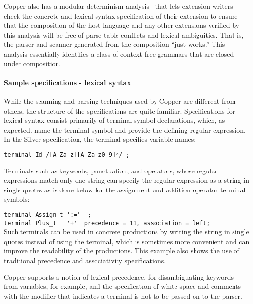 Copper also has a modular determinism
analysis~\cite{schwerdfeger09pldi} that lets extension writers check
the concrete and lexical syntax specification of their extension to
ensure that the composition of the host language and any other
extensions verified by this analysis will be free of parse table
conflicts and lexical ambiguities.  That is, the parser and scanner
generated from the composition ``just works.''  This analysis
essentially identifies a class of context free grammars that are
closed under composition.


\paragraph{Sample specifications - lexical syntax}
While the scanning and parsing techniques used by Copper are different
from others, the structure of the specifications are quite familiar.
%
Specifications for lexical syntax consist primarily of terminal symbol
declarations, which, as expected, name the terminal symbol and provide
the defining regular expression.  In the Silver specification, the
 terminal specifies variable names:

\noindent
\verb!terminal Id /[A-Za-z][A-Za-z0-9]*/ ;!

Terminals such as keywords, punctuation, and operators, whose regular
expressions match only one string can specify the regular expression
as a string in single quotes as is done below for the assignment and
addition operator terminal symbols:

\noindent
\verb!terminal Assign_t ':='  ;! \\
\verb!terminal Plus_t   '+'  precedence = 11, association = left;! \\
%
Such terminals can be used in concrete productions by writing the
string in single quotes instead of using the terminal, which is
sometimes more convenient and can improve the readability of the
productions. 
%
This example also shows the use of traditional precedence and
associativity specifications.

Copper supports a notion of lexical precedence, for disambiguating
keywords from variables, for example, and the specification of
white-space and comments with the  modifier that indicates
a terminal is not to be passed on to the parser.


